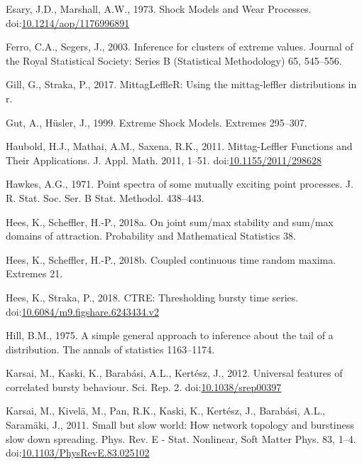 \documentclass[]{elsarticle} %
\begin{document}
\leavevmode\hypertarget{ref-Esary1973}{}%
Esary, J.D., Marshall, A.W., 1973. Shock Models and Wear Processes.
doi:\href{https://doi.org/10.1214/aop/1176996891}{10.1214/aop/1176996891}

\leavevmode\hypertarget{ref-ferro2003inference}{}%
Ferro, C.A., Segers, J., 2003. Inference for clusters of extreme values.
Journal of the Royal Statistical Society: Series B (Statistical
Methodology) 65, 545--556.

\leavevmode\hypertarget{ref-MittagLeffleR}{}%
Gill, G., Straka, P., 2017. MittagLeffleR: Using the mittag-leffler
distributions in r.

\leavevmode\hypertarget{ref-Gut1999}{}%
Gut, A., Hüsler, J., 1999. Extreme Shock Models. Extremes 295--307.

\leavevmode\hypertarget{ref-Haubold11}{}%
Haubold, H.J., Mathai, A.M., Saxena, R.K., 2011. Mittag-Leffler
Functions and Their Applications. J. Appl. Math. 2011, 1--51.
doi:\href{https://doi.org/10.1155/2011/298628}{10.1155/2011/298628}

\leavevmode\hypertarget{ref-hawkes1971point}{}%
Hawkes, A.G., 1971. Point spectra of some mutually exciting point
processes. J. R. Stat. Soc. Ser. B Stat. Methodol. 438--443.

\leavevmode\hypertarget{ref-hees2016joint}{}%
Hees, K., Scheffler, H.-P., 2018a. On joint sum/max stability and
sum/max domains of attraction. Probability and Mathematical Statistics
38.

\leavevmode\hypertarget{ref-hees2017coupled}{}%
Hees, K., Scheffler, H.-P., 2018b. Coupled continuous time random
maxima. Extremes 21.

\leavevmode\hypertarget{ref-CTRE}{}%
Hees, K., Straka, P., 2018. CTRE: Thresholding bursty time series.
doi:\href{https://doi.org/10.6084/m9.figshare.6243434.v2}{10.6084/m9.figshare.6243434.v2}

\leavevmode\hypertarget{ref-hill1975simple}{}%
Hill, B.M., 1975. A simple general approach to inference about the tail
of a distribution. The annals of statistics 1163--1174.

\leavevmode\hypertarget{ref-Karsai2012}{}%
Karsai, M., Kaski, K., Barabási, A.L., Kertész, J., 2012. Universal
features of correlated bursty behaviour. Sci. Rep. 2.
doi:\href{https://doi.org/10.1038/srep00397}{10.1038/srep00397}

\leavevmode\hypertarget{ref-Karsai2011}{}%
Karsai, M., Kivelä, M., Pan, R.K., Kaski, K., Kertész, J., Barabási,
A.L., Saramäki, J., 2011. Small but slow world: How network topology and
burstiness slow down spreading. Phys. Rev. E - Stat. Nonlinear, Soft
Matter Phys. 83, 1--4.
doi:\href{https://doi.org/10.1103/PhysRevE.83.025102}{10.1103/PhysRevE.83.025102}
\end{document}
